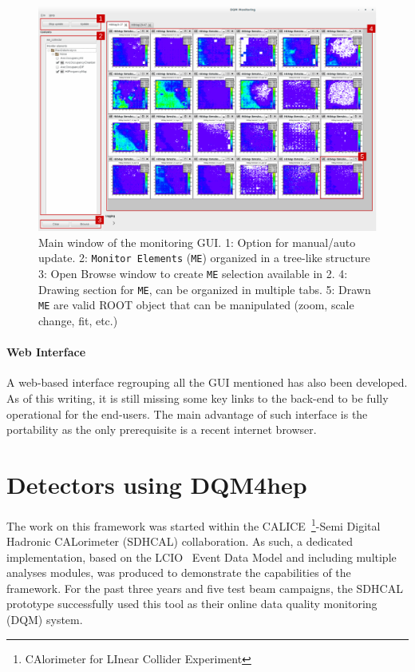\documentclass{webofc}
\begin{document}
\begin{figure}
  \centering
  \includegraphics[width=.95\textwidth]{figs/MaintInterfaceGUI.pdf}
    \caption{\label{fig:DQMMainViz} Main window of the monitoring GUI.
    1: Option for manual/auto update.
    2: \texttt{Monitor Elements} (\texttt{ME}) organized in a tree-like structure
    3: Open Browse window to create \texttt{ME} selection available in 2.
    4: Drawing section for \texttt{ME}, can be organized in multiple tabs.
    5: Drawn \texttt{ME} are valid ROOT object that can be manipulated (zoom, scale change, fit, etc.)
    }
\end{figure}

\paragraph{Web Interface}\label{par:WebGUI}
A web-based interface regrouping all the GUI mentioned has also been developed. As of this writing, it is still missing some key links to the back-end to be fully operational for the end-users. The main advantage of such interface is the portability as the only prerequisite is a recent internet browser.

\section{Detectors using DQM4hep}
\label{sec:detectors}

The work on this framework was started within the CALICE~\footnote{CAlorimeter for LInear Collider Experiment}-Semi Digital Hadronic CALorimeter (SDHCAL) collaboration.
As such, a dedicated implementation, based on the LCIO~\cite{LCIO} Event Data Model and including multiple analyses modules, was produced to demonstrate the capabilities of the framework. 
For the past three years and five test beam campaigns, the SDHCAL prototype successfully used this tool as their online data quality monitoring (DQM) system.
\end{document}
